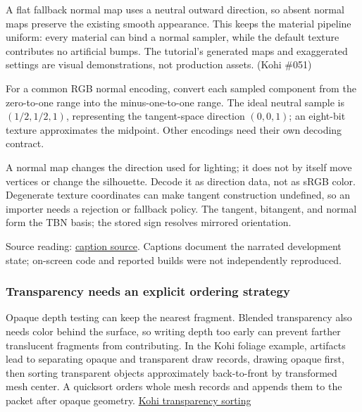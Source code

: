 A flat fallback normal map uses a neutral outward direction, so absent normal maps preserve the existing smooth appearance. This keeps the material pipeline uniform: every material can bind a normal sampler, while the default texture contributes no artificial bumps. The tutorial's generated maps and exaggerated settings are visual demonstrations, not production assets. (Kohi \#051)

For a common RGB normal encoding, convert each sampled component from the zero-to-one range into the minus-one-to-one range. The ideal neutral sample is \((1/2,1/2,1)\), representing the tangent-space direction \((0,0,1)\); an eight-bit texture approximates the midpoint. Other encodings need their own decoding contract.

A normal map changes the direction used for lighting; it does not by itself move vertices or change the silhouette. Decode it as direction data, not as sRGB color. Degenerate texture coordinates can make tangent construction undefined, so an importer needs a rejection or fallback policy. The tangent, bitangent, and normal form the TBN basis; the stored sign resolves mirrored orientation.

Source reading: \href{https://www.youtube.com/watch?v=I0259XQnKng}{caption source}. Captions document the narrated development state; on-screen code and reported builds were not independently reproduced.

\subsubsection{Transparency needs an explicit ordering strategy}\label{06-engine-ii-ch025-transparency-needs-an-explicit-ordering-strategy}

Opaque depth testing can keep the nearest fragment. Blended transparency also needs color behind the surface, so writing depth too early can prevent farther translucent fragments from contributing. In the Kohi foliage example, artifacts lead to separating opaque and transparent draw records, drawing opaque first, then sorting transparent objects approximately back-to-front by transformed mesh center. A quicksort orders whole mesh records and appends them to the packet after opaque geometry. \href{https://www.youtube.com/watch?v=duQSUgdrBk0}{Kohi transparency sorting}

